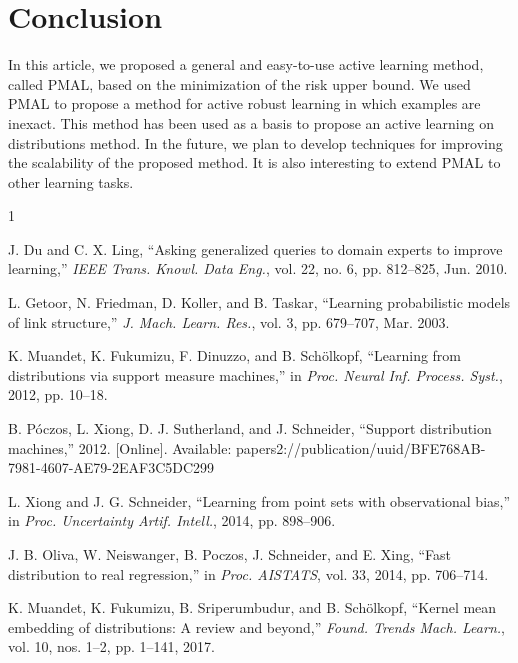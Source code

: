 \documentclass[10pt,twocolumn]{IEEEtran}
\begin{document}
	\section{Conclusion}
	
	In this article, we proposed a general and easy-to-use active learning method, called PMAL, based on the minimization of the risk upper bound. We used PMAL to propose a method for active robust learning in which examples are inexact. This method has been used as a basis to propose an active learning on distributions method. In the future, we plan to develop techniques for improving the scalability of the proposed method. It is also interesting to extend PMAL to other learning tasks.
	
	\balance
	
	
	\begin{thebibliography}{1}
		
		J. Du and C. X. Ling, ``Asking generalized queries to domain experts to improve learning,'' \emph{IEEE Trans. Knowl. Data Eng.}, vol. 22, no. 6, pp. 812--825, Jun. 2010.
		
		L. Getoor, N. Friedman, D. Koller, and B. Taskar, ``Learning probabilistic models of link structure,'' \emph{J. Mach. Learn. Res.}, vol. 3, pp. 679--707, Mar. 2003.
		
		K. Muandet, K. Fukumizu, F. Dinuzzo, and B. Schölkopf, ``Learning from distributions via support measure machines,'' in \emph{Proc. Neural Inf. Process. Syst.}, 2012, pp. 10--18.
		
		B. Póczos, L. Xiong, D. J. Sutherland, and J. Schneider, ``Support distribution machines,'' 2012. [Online]. Available: papers2://publication/uuid/BFE768AB-7981-4607-AE79-2EAF3C5DC299
		
		L. Xiong and J. G. Schneider, ``Learning from point sets with observational bias,'' in \emph{Proc. Uncertainty Artif. Intell.}, 2014, pp. 898--906.
		
		J. B. Oliva, W. Neiswanger, B. Poczos, J. Schneider, and E. Xing, ``Fast distribution to real regression,'' in \emph{Proc. AISTATS}, vol. 33, 2014, pp. 706--714.
		
		K. Muandet, K. Fukumizu, B. Sriperumbudur, and B. Schölkopf, ``Kernel mean embedding of distributions: A review and beyond,'' \emph{Found. Trends Mach. Learn.}, vol. 10, nos. 1--2, pp. 1--141, 2017.
		

\end{thebibliography}
\end{document}
